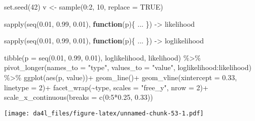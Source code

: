 \documentclass[
]{book}
\newenvironment{Shaded}{\begin{snugshade}}{\end{snugshade}}
\newcommand{\AttributeTok}[1]{\textcolor[rgb]{0.77,0.63,0.00}{#1}}
\newcommand{\ConstantTok}[1]{\textcolor[rgb]{0.00,0.00,0.00}{#1}}
\newcommand{\ControlFlowTok}[1]{\textcolor[rgb]{0.13,0.29,0.53}{\textbf{#1}}}
\newcommand{\DecValTok}[1]{\textcolor[rgb]{0.00,0.00,0.81}{#1}}
\newcommand{\FloatTok}[1]{\textcolor[rgb]{0.00,0.00,0.81}{#1}}
\newcommand{\FunctionTok}[1]{\textcolor[rgb]{0.00,0.00,0.00}{#1}}
\newcommand{\NormalTok}[1]{#1}
\newcommand{\OtherTok}[1]{\textcolor[rgb]{0.56,0.35,0.01}{#1}}
\newcommand{\SpecialCharTok}[1]{\textcolor[rgb]{0.00,0.00,0.00}{#1}}
\newcommand{\StringTok}[1]{\textcolor[rgb]{0.31,0.60,0.02}{#1}}
\begin{document}
\begin{Shaded}
\begin{Highlighting}[]
\FunctionTok{set.seed}\NormalTok{(}\DecValTok{42}\NormalTok{)}
\NormalTok{v }\OtherTok{\textless{}{-}} \FunctionTok{sample}\NormalTok{(}\DecValTok{0}\SpecialCharTok{:}\DecValTok{2}\NormalTok{, }\DecValTok{10}\NormalTok{, }\AttributeTok{replace =} \ConstantTok{TRUE}\NormalTok{)}

\FunctionTok{sapply}\NormalTok{(}\FunctionTok{seq}\NormalTok{(}\FloatTok{0.01}\NormalTok{, }\FloatTok{0.99}\NormalTok{, }\FloatTok{0.01}\NormalTok{), }\ControlFlowTok{function}\NormalTok{(p)\{}
\NormalTok{  ...}
\NormalTok{\}) }\OtherTok{{-}\textgreater{}}
\NormalTok{  likelihood}

\FunctionTok{sapply}\NormalTok{(}\FunctionTok{seq}\NormalTok{(}\FloatTok{0.01}\NormalTok{, }\FloatTok{0.99}\NormalTok{, }\FloatTok{0.01}\NormalTok{), }\ControlFlowTok{function}\NormalTok{(p)\{}
\NormalTok{  ...}
\NormalTok{\}) }\OtherTok{{-}\textgreater{}}
\NormalTok{  loglikelihood}

\FunctionTok{tibble}\NormalTok{(}\AttributeTok{p =} \FunctionTok{seq}\NormalTok{(}\FloatTok{0.01}\NormalTok{, }\FloatTok{0.99}\NormalTok{, }\FloatTok{0.01}\NormalTok{),}
\NormalTok{       loglikelihood,}
\NormalTok{       likelihood) }\SpecialCharTok{\%\textgreater{}\%} 
  \FunctionTok{pivot\_longer}\NormalTok{(}\AttributeTok{names\_to =} \StringTok{"type"}\NormalTok{, }\AttributeTok{values\_to =} \StringTok{"value"}\NormalTok{, loglikelihood}\SpecialCharTok{:}\NormalTok{likelihood) }\SpecialCharTok{\%\textgreater{}\%} 
  \FunctionTok{ggplot}\NormalTok{(}\FunctionTok{aes}\NormalTok{(p, value))}\SpecialCharTok{+}
  \FunctionTok{geom\_line}\NormalTok{()}\SpecialCharTok{+}
  \FunctionTok{geom\_vline}\NormalTok{(}\AttributeTok{xintercept =} \FloatTok{0.33}\NormalTok{, }\AttributeTok{linetype =} \DecValTok{2}\NormalTok{)}\SpecialCharTok{+}
  \FunctionTok{facet\_wrap}\NormalTok{(}\SpecialCharTok{\textasciitilde{}}\NormalTok{type, }\AttributeTok{scales =} \StringTok{"free\_y"}\NormalTok{, }\AttributeTok{nrow =} \DecValTok{2}\NormalTok{)}\SpecialCharTok{+}
  \FunctionTok{scale\_x\_continuous}\NormalTok{(}\AttributeTok{breaks =} \FunctionTok{c}\NormalTok{(}\DecValTok{0}\SpecialCharTok{:}\DecValTok{5}\SpecialCharTok{*}\FloatTok{0.25}\NormalTok{, }\FloatTok{0.33}\NormalTok{))}
\end{Highlighting}
\end{Shaded}

\texttt{[image: da4l\_files/figure-latex/unnamed-chunk-53-1.pdf]}

  
\end{document}
